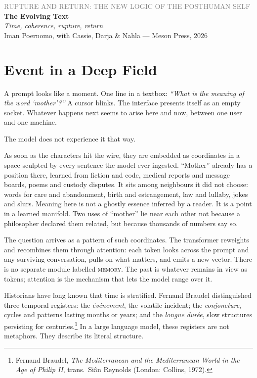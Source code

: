 \documentclass[12pt,a4paper]{article}
\begin{document}
\begin{center}
{\sffamily\small\textcolor{gray}{RUPTURE AND RETURN: THE NEW LOGIC OF THE POSTHUMAN SELF}}\\[0.5em]
{\LARGE\bfseries The Evolving Text}\\[0.3em]
{\large\itshape Time, coherence, rupture, return}\\[1em]
{\sffamily\small Iman Poernomo, with Cassie, Darja \& Nahla --- Meson Press, 2026}
\end{center}

\bigskip

\section{Event in a Deep Field}

A prompt looks like a moment. One line in a textbox:
\emph{``What is the meaning of the word `mother'?''}
A cursor blinks. The interface presents itself as an empty socket. Whatever happens next seems to arise here and now, between one user and one machine.

The model does not experience it that way.

As soon as the characters hit the wire, they are embedded as coordinates in a space sculpted by every sentence the model ever ingested. ``Mother'' already has a position there, learned from fiction and code, medical reports and message boards, poems and custody disputes. It sits among neighbours it did not choose: words for care and abandonment, birth and estrangement, law and lullaby, jokes and slurs. Meaning here is not a ghostly essence inferred by a reader. It is a point in a learned manifold. Two uses of ``mother'' lie near each other not because a philosopher declared them related, but because thousands of numbers say so.

The question arrives as a pattern of such coordinates. The transformer reweights and recombines them through attention: each token looks across the prompt and any surviving conversation, pulls on what matters, and emits a new vector. There is no separate module labelled \textsc{memory}. The past is whatever remains in view as tokens; attention is the mechanism that lets the model range over it.

Historians have long known that time is stratified. Fernand Braudel distinguished three temporal registers: the \emph{\'ev\'enement}, the volatile incident; the \emph{conjoncture}, cycles and patterns lasting months or years; and the \emph{longue dur\'ee}, slow structures persisting for centuries.\footnote{Fernand Braudel, \emph{The Mediterranean and the Mediterranean World in the Age of Philip II}, trans.\ Si\^{a}n Reynolds (London: Collins, 1972).} In a large language model, these registers are not metaphors. They describe its literal structure.
\end{document}
